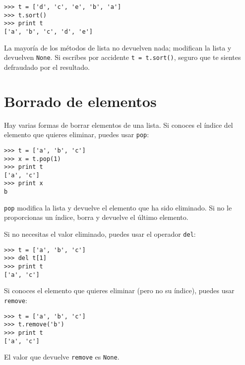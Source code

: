 \beforeverb
\begin{verbatim}
>>> t = ['d', 'c', 'e', 'b', 'a']
>>> t.sort()
>>> print t
['a', 'b', 'c', 'd', 'e']
\end{verbatim}
\afterverb
%
La mayoría de los métodos de lista no devuelven nada; modifican la lista y devuelven {\tt None}.
Si escribes por accidente {\tt t = t.sort()}, seguro que te sientes defraudado
por el resultado.


\section{Borrado de elementos}


Hay varias formas de borrar elementos de una lista. Si conoces
el índice del elemento que quieres eliminar, puedes usar
{\tt pop}:


\beforeverb
\begin{verbatim}
>>> t = ['a', 'b', 'c']
>>> x = t.pop(1)
>>> print t
['a', 'c']
>>> print x
b
\end{verbatim}
\afterverb
%
{\tt pop} modifica la lista y devuelve el elemento que ha sido eliminado.
Si no le proporcionas un índice, borra y devuelve el
último elemento.

Si no necesitas el valor eliminado, puedes usar el operador
{\tt del}:


\beforeverb
\begin{verbatim}
>>> t = ['a', 'b', 'c']
>>> del t[1]
>>> print t
['a', 'c']
\end{verbatim}
\afterverb
%

Si conoces el elemento que quieres eliminar (pero no su índice), puedes
usar {\tt remove}:


\beforeverb
\begin{verbatim}
>>> t = ['a', 'b', 'c']
>>> t.remove('b')
>>> print t
['a', 'c']
\end{verbatim}
\afterverb
%
El valor que devuelve {\tt remove} es {\tt None}.


